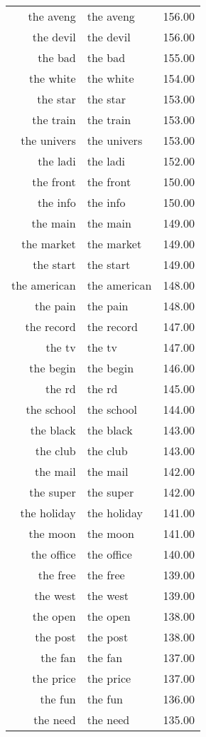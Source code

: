 \begin{table}[ht]
\begin{tabular}{rlr}
  the aveng & the aveng & 156.00 \\ 
  the devil & the devil & 156.00 \\ 
  the bad & the bad & 155.00 \\ 
  the white & the white & 154.00 \\ 
  the star & the star & 153.00 \\ 
  the train & the train & 153.00 \\ 
  the univers & the univers & 153.00 \\ 
  the ladi & the ladi & 152.00 \\ 
  the front & the front & 150.00 \\ 
  the info & the info & 150.00 \\ 
  the main & the main & 149.00 \\ 
  the market & the market & 149.00 \\ 
  the start & the start & 149.00 \\ 
  the american & the american & 148.00 \\ 
  the pain & the pain & 148.00 \\ 
  the record & the record & 147.00 \\ 
  the tv & the tv & 147.00 \\ 
  the begin & the begin & 146.00 \\ 
  the rd & the rd & 145.00 \\ 
  the school & the school & 144.00 \\ 
  the black & the black & 143.00 \\ 
  the club & the club & 143.00 \\ 
  the mail & the mail & 142.00 \\ 
  the super & the super & 142.00 \\ 
  the holiday & the holiday & 141.00 \\ 
  the moon & the moon & 141.00 \\ 
  the office & the office & 140.00 \\ 
  the free & the free & 139.00 \\ 
  the west & the west & 139.00 \\ 
  the open & the open & 138.00 \\ 
  the post & the post & 138.00 \\ 
  the fan & the fan & 137.00 \\ 
  the price & the price & 137.00 \\ 
  the fun & the fun & 136.00 \\ 
  the need & the need & 135.00 \\ 

\end{tabular}
\end{table}
